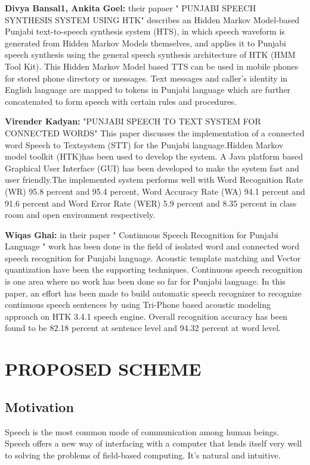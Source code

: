 \documentclass[12pt,a4paper,oldfontcommands]{memoir}
\begin{document}
\textbf{Divya Bansal1, Ankita Goel:} their papaer " PUNJABI SPEECH SYNTHESIS SYSTEM USING HTK" describes an Hidden Markov Model-based Punjabi text-to-speech synthesis system (HTS), in
which speech waveform is generated from Hidden Markov Models themselves, and applies it to Punjabi
speech synthesis using the general speech synthesis architecture of HTK (HMM Tool Kit). This Hidden
Markov Model based TTS can be used in mobile phones for stored phone directory or messages. Text
messages and caller’s identity in English language are mapped to tokens in Punjabi language which are
further concatenated to form speech with certain rules and procedures\cite{16}. 

\textbf{Virender Kadyan:} "PUNJABI SPEECH TO TEXT SYSTEM FOR CONNECTED WORDS" This paper
discusses the implementation of a connected word
Speech to Textsystem (STT) for the Punjabi
language.Hidden Markov model toolkit (HTK)has been
used to develop the system. A Java platform based
Graphical User Interface (GUI) has been developed to
make the system fast and user friendly.The implemented
system performs well with Word Recognition Rate
(WR) 95.8 percent and 95.4 percent, Word Accuracy Rate (WA)
94.1 percent and 91.6 percent and Word Error Rate (WER) 5.9 percent
and 8.35 percent in class room and open environment
respectively\cite{17}. 

\textbf{Wiqas Ghai:} in their paper " Continuous Speech Recognition for Punjabi Language " work has been
done in the field of isolated word and connected word
speech recognition for Punjabi language. Acoustic template
matching and Vector quantization have been the supporting
techniques. Continuous speech recognition is one area where
no work has been done so far for Punjabi language. In this
paper, an effort has been made to build automatic speech
recognizer to recognize continuous speech sentences by
using Tri-Phone based acoustic modeling approach on HTK
3.4.1 speech engine. Overall recognition accuracy has
been found to be 82.18 percent at sentence level and 94.32 percent
at word level\cite{18}.




\chapter{PROPOSED SCHEME}
\section{Motivation}
Speech is the most common mode of communication among human beings. Speech
offers a new way of interfacing with a computer that lends itself very well to solving
the problems of field-based computing. It's natural and intuitive. 
\end{document}
